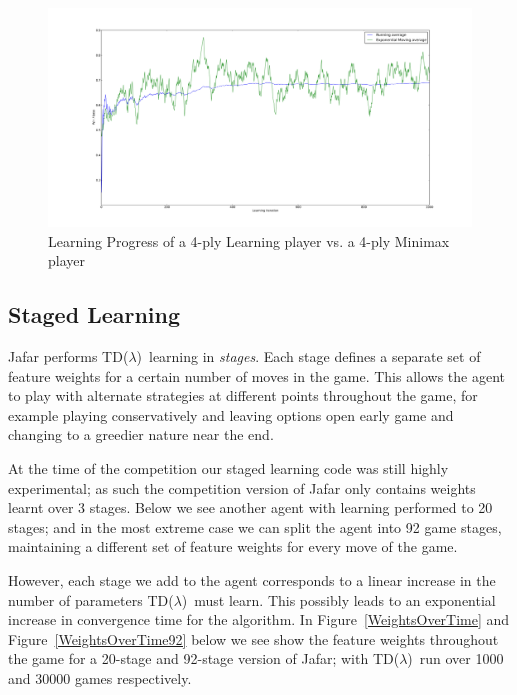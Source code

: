 \documentclass[11pt]{article}
\newcommand{\tdl}{TD($\lambda$)}
\begin{document}
\begin{figure}[htbp]
  \centering
  \includegraphics[trim= 6cm 2cm 5.5cm 3cm, clip,width=1\textwidth]{../Graphs/Learning_2ply_First1000.pdf}
  \caption{Learning Progress of a 4-ply Learning player vs. a 4-ply Minimax
    player}
  \label{LearningProgress}
\end{figure}

\subsection{Staged Learning}
\label{sec:staging}

Jafar performs \tdl\ learning in \emph{stages}. Each stage defines a separate
set of feature weights for a certain number of moves in the game. This allows
the agent to play with alternate strategies at different points throughout the
game, for example playing conservatively and leaving options open early game
and changing to a greedier nature near the end.

At the time of the competition our staged learning code was still highly 
experimental; as such the competition version of Jafar only contains weights learnt
over 3 stages. Below we see another agent with learning performed to 20 stages; 
and in the most extreme case we can split the agent into 92 game stages, maintaining a different set of
feature weights for every move of the game.

However, each stage we add to the agent corresponds to a linear increase in
the number of parameters \tdl\ must learn. This possibly leads to an
exponential increase in convergence time for the algorithm.  In
Figure~\ref{WeightsOverTime} and Figure~\ref{WeightsOverTime92} below we see
show the feature weights throughout the game for a 20-stage and 92-stage
version of Jafar; with \tdl\ run over 1000 and 30000 games respectively.
\end{document}
